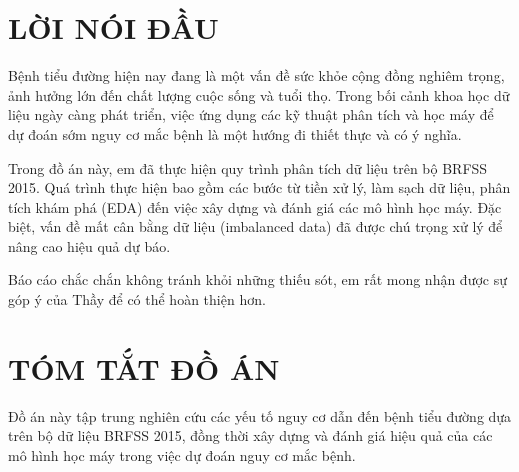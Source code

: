 \documentclass{article}
\begin{document}
\tableofcontents
\thispagestyle{empty}
\cleardoublepage

{}
{\let\oldnumberline\numberline
    \renewcommand{\numberline}{Bảng~\oldnumberline}
    \listoftables}
\newpage

{}
{\let\oldnumberline\numberline
    \renewcommand{\numberline}{Hình~\oldnumberline}
    \listoffigures}
\newpage

\section*{LỜI NÓI ĐẦU}
\thispagestyle{empty}
Bệnh tiểu đường hiện nay đang là một vấn đề sức khỏe cộng đồng nghiêm trọng, ảnh hưởng lớn đến chất lượng cuộc sống và tuổi thọ. Trong bối cảnh khoa học dữ liệu ngày càng phát triển, việc ứng dụng các kỹ thuật phân tích và học máy để dự đoán sớm nguy cơ mắc bệnh là một hướng đi thiết thực và có ý nghĩa.

Trong đồ án này, em đã thực hiện quy trình phân tích dữ liệu trên bộ BRFSS 2015. Quá trình thực hiện bao gồm các bước từ tiền xử lý, làm sạch dữ liệu, phân tích khám phá (EDA) đến việc xây dựng và đánh giá các mô hình học máy. Đặc biệt, vấn đề mất cân bằng dữ liệu (imbalanced data) đã được chú trọng xử lý để nâng cao hiệu quả dự báo.

Báo cáo chắc chắn không tránh khỏi những thiếu sót, em rất mong nhận được sự góp ý của Thầy để có thể hoàn thiện hơn.
\cleardoublepage

\section*{TÓM TẮT ĐỒ ÁN}
Đồ án này tập trung nghiên cứu các yếu tố nguy cơ dẫn đến bệnh tiểu đường dựa trên bộ dữ liệu BRFSS 2015, đồng thời xây dựng và đánh giá hiệu quả của các mô hình học máy trong việc dự đoán nguy cơ mắc bệnh.
\end{document}
